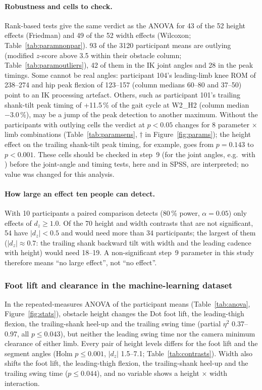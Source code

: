 \paragraph{Robustness and cells to check.} Rank-based tests give the same verdict as the ANOVA for 43 of the 52 height effects
(Friedman) and 49 of the 52 width effects (Wilcoxon; Table~\ref{tab:paramnonpar}). 93 of the 3120 participant means are outlying
(modified $z$-score above 3.5 within their obstacle column; Table~\ref{tab:paramoutliers}), 42 of them in the IK joint angles and 28 in
the peak timings. Some cannot be real angles: participant 104's leading-limb knee ROM of 238--274\textdegree{} and hip peak flexion of
123--157\textdegree{} (column medians 60--80\textdegree{} and 37--50\textdegree{}) point to an IK processing artefact. Others, such as
participant 101's trailing shank-tilt peak timing of +11.5\,\% of the gait cycle at W2\_H2 (column median $-3.0$\,\%), may be a jump
of the peak detection to another maximum. Without the participants with outlying cells the verdict at $p < 0.05$ changes for 8
parameter $\times$ limb combinations (Table~\ref{tab:paramsens}, $\dagger$ in Figure~\ref{fig:params}); the height effect on the
trailing shank-tilt peak timing, for example, goes from $p = 0.143$ to $p < 0.001$. These cells should be checked in step~9 (for the
joint angles, e.g.\ with ) before the joint-angle and timing tests, here and in SPSS, are interpreted; no value
was changed for this analysis.

\paragraph{How large an effect ten people can detect.} With 10 participants a paired comparison detects (80\,\% power,
$\alpha = 0.05$) only effects of $d_z \geq 1.0$. Of the 70 height and width contrasts that are not significant, 54 have
$\lvert d_z \rvert < 0.5$ and would need more than 34 participants; the largest of them ($\lvert d_z \rvert \approx 0.7$: the trailing
shank backward tilt with width and the leading cadence with height) would need 18--19. A non-significant step~9 parameter in this study
therefore means ``no large effect'', not ``no effect''.

\subsubsection{Foot lift and clearance in the machine-learning dataset}

In the repeated-measures ANOVA of the participant means (Table~\ref{tab:anova}, Figure~\ref{fig:stats}), obstacle height changes the
Dot foot lift, the
leading-thigh flexion, the trailing-shank heel-up and the trailing swing time (partial $\eta^2$ 0.37--0.97, all
$p \leq 0.043$), but neither the leading swing time nor the camera minimum clearance of either limb. Every pair of height levels
differs for the foot lift and the segment angles (Holm $p \leq 0.001$, $\lvert d_z \rvert$ 1.5--7.1; Table~\ref{tab:contrasts}).
Width also shifts the foot lift, the leading-thigh flexion, the trailing-shank heel-up and the trailing swing time
($p \leq 0.044$), and no variable shows a height $\times$ width interaction.

